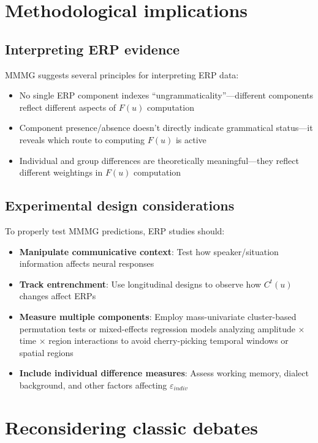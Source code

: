 \documentclass[12pt,letterpaper]{article}
\begin{document}
\section{Methodological implications}
\subsection{Interpreting ERP evidence}
MMMG suggests several principles for interpreting ERP data:

\begin{itemize}
    \item No single ERP component indexes \enquote{ungrammaticality}---different components reflect different aspects of $F(u)$ computation
    \item Component presence/absence doesn't directly indicate grammatical status---it reveals which route to computing $F(u)$ is active
    \item Individual and group differences are theoretically meaningful---they reflect different weightings in $F(u)$ computation
\end{itemize}

\subsection{Experimental design considerations}
To properly test MMMG predictions, ERP studies should:

\begin{itemize}
    \item \textbf{Manipulate communicative context}: Test how speaker/situation information affects neural responses
    \item \textbf{Track entrenchment}: Use longitudinal designs to observe how $C^t(u)$ changes affect ERPs
    \item \textbf{Measure multiple components}: Employ mass-univariate cluster-based permutation tests or mixed-effects regression models analyzing amplitude × time × region interactions to avoid cherry-picking temporal windows or spatial regions
    \item \textbf{Include individual difference measures}: Assess working memory, dialect background, and other factors affecting \(\varepsilon_{indiv}\)
\end{itemize}

\section{Reconsidering classic debates}
\end{document}
